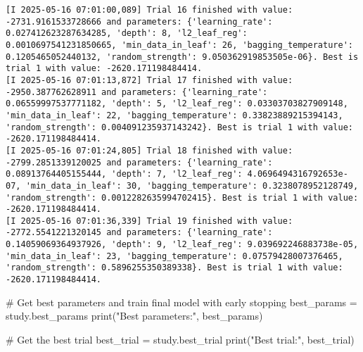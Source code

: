 \documentclass[
  letterpaper,
  DIV=11,
  numbers=noendperiod]{scrreprt}
\newenvironment{Shaded}{\begin{snugshade}}{\end{snugshade}}
\newcommand{\BuiltInTok}[1]{\textcolor[rgb]{0.00,0.23,0.31}{#1}}
\newcommand{\CommentTok}[1]{\textcolor[rgb]{0.37,0.37,0.37}{#1}}
\newcommand{\NormalTok}[1]{\textcolor[rgb]{0.00,0.23,0.31}{#1}}
\newcommand{\OperatorTok}[1]{\textcolor[rgb]{0.37,0.37,0.37}{#1}}
\newcommand{\StringTok}[1]{\textcolor[rgb]{0.13,0.47,0.30}{#1}}
\begin{document}
\begin{verbatim}
[I 2025-05-16 07:01:00,089] Trial 16 finished with value: -2731.9161533728666 and parameters: {'learning_rate': 0.027412623287634285, 'depth': 8, 'l2_leaf_reg': 0.0010697541231850665, 'min_data_in_leaf': 26, 'bagging_temperature': 0.1205465052440132, 'random_strength': 9.050362919853505e-06}. Best is trial 1 with value: -2620.171198484414.
[I 2025-05-16 07:01:13,872] Trial 17 finished with value: -2950.387762628911 and parameters: {'learning_rate': 0.06559997537771182, 'depth': 5, 'l2_leaf_reg': 0.03303703827909148, 'min_data_in_leaf': 22, 'bagging_temperature': 0.33823889215394143, 'random_strength': 0.004091235937143242}. Best is trial 1 with value: -2620.171198484414.
[I 2025-05-16 07:01:24,805] Trial 18 finished with value: -2799.2851339120025 and parameters: {'learning_rate': 0.08913764405155444, 'depth': 7, 'l2_leaf_reg': 4.0696494316792653e-07, 'min_data_in_leaf': 30, 'bagging_temperature': 0.3238078952128749, 'random_strength': 0.0012282635994702415}. Best is trial 1 with value: -2620.171198484414.
[I 2025-05-16 07:01:36,339] Trial 19 finished with value: -2772.5541221320145 and parameters: {'learning_rate': 0.14059069364937926, 'depth': 9, 'l2_leaf_reg': 9.039692246883738e-05, 'min_data_in_leaf': 23, 'bagging_temperature': 0.07579428007376465, 'random_strength': 0.5896255350389338}. Best is trial 1 with value: -2620.171198484414.
\end{verbatim}

\begin{Shaded}
\begin{Highlighting}[]
\CommentTok{\# Get best parameters and train final model with early stopping}
\NormalTok{best\_params }\OperatorTok{=}\NormalTok{ study.best\_params}
\BuiltInTok{print}\NormalTok{(}\StringTok{"Best parameters:"}\NormalTok{, best\_params)}

\CommentTok{\# Get the best trial}
\NormalTok{best\_trial }\OperatorTok{=}\NormalTok{ study.best\_trial}
\BuiltInTok{print}\NormalTok{(}\StringTok{"Best trial:"}\NormalTok{, best\_trial)}
\end{Highlighting}
\end{Shaded}
\end{document}

